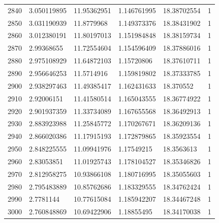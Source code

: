 \begin{longtable}{llllll}
2840 & 3.050119895 & 11.95362951 & 1.146761995 & 18.38702554 & 1 \\
2850 & 3.031190939 & 11.8779968 & 1.149373376 & 18.38431902 & 1 \\
2860 & 3.012380191 & 11.80197013 & 1.151984848 & 18.38159734 & 1 \\
2870 & 2.99368655 & 11.72554604 & 1.154596409 & 18.37886016 & 1 \\
2880 & 2.975108929 & 11.64872103 & 1.15720806 & 18.37610711 & 1 \\
2890 & 2.956646253 & 11.5714916 & 1.159819802 & 18.37333785 & 1 \\
2900 & 2.938297463 & 11.49385417 & 1.162431633 & 18.370552 & 1 \\
2910 & 2.92006151 & 11.41580514 & 1.165043555 & 18.36774922 & 1 \\
2920 & 2.901937359 & 11.33734089 & 1.167655568 & 18.36492913 & 1 \\
2930 & 2.883923988 & 11.25845772 & 1.170267671 & 18.36209136 & 1 \\
2940 & 2.866020386 & 11.17915193 & 1.172879865 & 18.35923554 & 1 \\
2950 & 2.848225555 & 11.09941976 & 1.17549215 & 18.3563613 & 1 \\
2960 & 2.83053851 & 11.01925743 & 1.178104527 & 18.35346826 & 1 \\
2970 & 2.812958275 & 10.93866108 & 1.180716995 & 18.35055603 & 1 \\
2980 & 2.795483889 & 10.85762686 & 1.183329555 & 18.34762424 & 1 \\
2990 & 2.7781144 & 10.77615084 & 1.185942207 & 18.34467248 & 1 \\
3000 & 2.760848869 & 10.69422906 & 1.18855495 & 18.34170038 & 1 \\
\bottomrule
\end{longtable}
